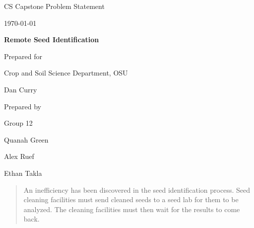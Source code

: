 \documentclass[onecolumn, draftclsnofoot,10pt, compsoc]{IEEEtran}
\def \CapstoneTeamName{		The Cleverly Named Team}
\def \CapstoneTeamNumber{		12}
\def \GroupMemberOne{			Quanah Green}
\def \GroupMemberTwo{			Alex Ruef}
\def \GroupMemberThree{			Ethan Takla}
\def \CapstoneProjectName{		Remote Seed Identification}
\def \CapstoneSponsorCompany{	Crop and Soil Science Department, OSU}
\def \CapstoneSponsorPerson{		Dan Curry}
\def \DocType{		Problem Statement
				}
\newcommand{\NameSigPair}[1]{\par
\makebox[2.75in][r]{#1} \hfil 	\makebox[3.25in]{\makebox[2.25in]{\hrulefill} \hfill		\makebox[.75in]{\hrulefill}}
\par\vspace{-12pt} \textit{\tiny\noindent
\makebox[2.75in]{} \hfil		\makebox[3.25in]{\makebox[2.25in][r]{Signature} \hfill	\makebox[.75in][r]{Date}}}}
\renewcommand{\NameSigPair}[1]{#1}
\begin{document}
\begin{titlepage}
    \begin{singlespace}
        \hfill 
        \par\vspace{.2in}
        \centering
        \scshape{
            \huge CS Capstone \DocType \par
            {\large\today}\par
            \vspace{.5in}
            \textbf{\Huge\CapstoneProjectName}\par
            \vfill
            {\large Prepared for}\par
            \Huge \CapstoneSponsorCompany\par
            \vspace{5pt}
            {\Large\NameSigPair{\CapstoneSponsorPerson}\par}
            {\large Prepared by }\par
            Group\CapstoneTeamNumber\par
            \vspace{5pt}
            {\Large
                \NameSigPair{\GroupMemberOne}\par
                \NameSigPair{\GroupMemberTwo}\par
                \NameSigPair{\GroupMemberThree}\par
            }
            \vspace{20pt}
        }
        \begin{abstract}
	An inefficiency has been discovered in the seed identification process.
	Seed cleaning facilities must send cleaned seeds to a seed lab for them to be analyzed.
	The cleaning facilities must then wait for the results to come back.

\end{abstract}
\end{singlespace}
\end{titlepage}
\end{document}
